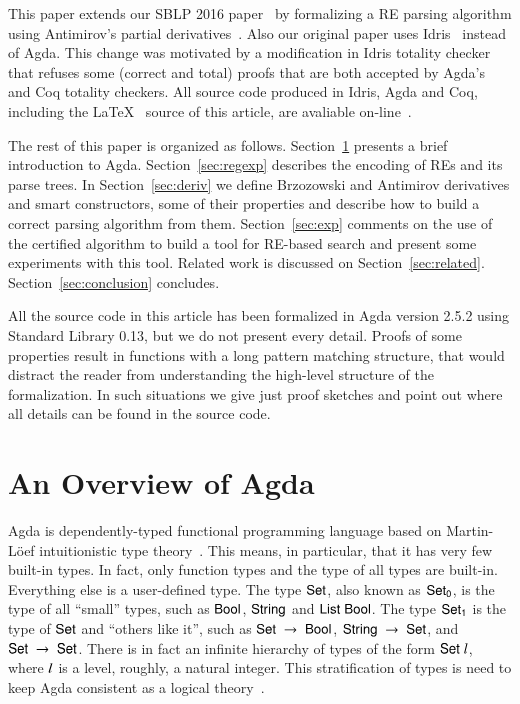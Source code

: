 \documentclass[review]{elsarticle}
\newcommand{\D}[1]{\blue{\mathsf{#1}}}
\newcommand{\V}[1]{\purple{\mathit{#1}}}
\begin{document}
This paper extends our SBLP 2016 paper~\cite{Lopes2016} by formalizing
a RE parsing algorithm using Antimirov's partial
derivatives~\cite{Antimirov1996}.  Also our original paper uses
Idris~\cite{Brady2013} instead of Agda. This change was motivated by a
modification in Idris totality checker that refuses some (correct and
total) proofs that are both accepted by Agda's and Coq totality
checkers. All source code produced in Idris, Agda and Coq, including
the \LaTeX~ source of this article, are avaliable
on-line~\cite{regex-rep}.

The rest of this paper is organized as follows. Section~\ref{sec:agda}
presents a brief introduction to Agda. Section~\ref{sec:regexp}
describes the encoding of REs and its parse trees. In
Section~\ref{sec:deriv} we define Brzozowski and Antimirov derivatives
and smart constructors, some of their properties and describe how to
build a correct parsing algorithm from them. Section~\ref{sec:exp}
comments on the use of the certified algorithm to build a tool for
RE-based search and present some experiments with this tool. Related
work is discussed on
Section~\ref{sec:related}. Section~\ref{sec:conclusion} concludes.

All the source code in this article has been formalized in Agda
version 2.5.2 using Standard Library 0.13, but
we do not present every detail. Proofs of some properties result in
functions with a long pattern matching structure, that would distract
the reader from understanding the high-level structure of the
formalization. In such situations we give just proof sketches and point
out where all details can be found in the source code.

\section{An Overview of Agda}\label{sec:agda}


Agda is dependently-typed functional programming language based on Martin-L\"oef
intuitionistic type theory~\cite{Lof98}. This means, in particular, that it has
very few built-in types. In fact, only function types and the type of all types
are built-in. Everything else is a user-defined type. The type \ensuremath{\D{Set}}, also known
as \ensuremath{\D{Set}_{\D{0}}}, is the type of all ``small'' types, such as \ensuremath{\D{Bool}}, \ensuremath{\D{String}} and \ensuremath{\D{List}\;\D{Bool}}.
The type \ensuremath{\D{Set}_{\D{1}}} is the type of \ensuremath{\D{Set}} and ``others like it'', such as \ensuremath{\D{Set}\;\to \;\D{Bool}},
\ensuremath{\D{String}\;\to \;\D{Set}}, and \ensuremath{\D{Set}\;\to \;\D{Set}}. There is in fact an infinite hierarchy of types of the
form \ensuremath{\D{Set}\;\V{l}}, where \ensuremath{\V{l}} is a level, roughly, a natural integer. This stratification
of types is need to keep Agda consistent as a logical theory~\cite{Sorensen2006}.
\end{document}
